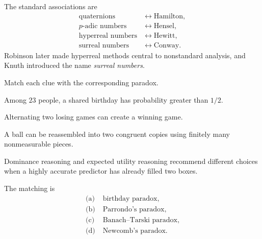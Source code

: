     \begin{solution}
        The standard associations are
        \[
            \boxed{
                \begin{aligned}
                    \text{quaternions}
                    &\longleftrightarrow \text{Hamilton},\\
                    p\text{-adic numbers}
                    &\longleftrightarrow \text{Hensel},\\
                    \text{hyperreal numbers}
                    &\longleftrightarrow \text{Hewitt},\\
                    \text{surreal numbers}
                    &\longleftrightarrow \text{Conway}.
                \end{aligned}
            }
        \]
        Robinson later made hyperreal methods central to nonstandard analysis,
        and Knuth introduced the name \emph{surreal numbers}.
    \end{solution}

    \begin{expectedproblem}
        Match each clue with the corresponding paradox.
        \begin{problemsubparts}
            \item Among $23$ people, a shared birthday has probability greater
                  than $1/2$.
            \item Alternating two losing games can create a winning game.
            \item A ball can be reassembled into two congruent copies using
                  finitely many nonmeasurable pieces.
            \item Dominance reasoning and expected utility reasoning recommend
                  different choices when a highly accurate predictor has already
                  filled two boxes.
        \end{problemsubparts}
    \end{expectedproblem}

    \begin{solution}
        The matching is
        \[
            \boxed{
                \begin{aligned}
                    \text{(a)}\;&\text{birthday paradox},\\
                    \text{(b)}\;&\text{Parrondo's paradox},\\
                    \text{(c)}\;&\text{Banach--Tarski paradox},\\
                    \text{(d)}\;&\text{Newcomb's paradox}.
                \end{aligned}
            }
        \]
    \end{solution}

